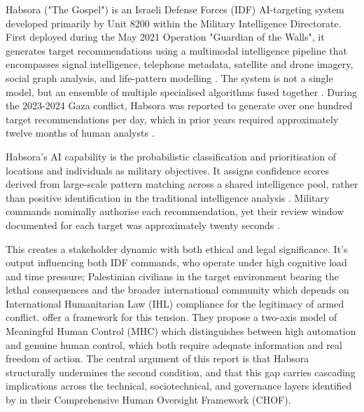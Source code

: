 Habsora ("The Gospel") is an Israeli Defense Forces (IDF) AI-targeting system developed primarily by Unit 8200 within the Military Intelligence Directorate. First deployed during the May 2021 Operation "Guardian of the Walls", it generates target recommendations using a multimodal intelligence pipeline that encompasses signal intelligence, telephone metadata, satellite and drone imagery, social graph analysis, and life-pattern modelling \cite{abraham_2024, dwoskin_2024}. The system is not a single model, but an ensemble of multiple specialised algorithms fused together \cite{dwoskin_2024}. During the 2023-2024 Gaza conflict, Habsora was reported to generate over one hundred target recommendations per day, which in prior years required approximately twelve months of human analysts \cite{abraham_2024, ynet_2024}.

Habsora's AI capability is the probabilistic classification and prioritisation of locations and individuals as military objectives. It assigns confidence scores derived from large-scale pattern matching across a shared intelligence pool, rather than positive identification in the traditional intelligence analysis \cite{ootlaws}. Military commands nominally authorise each recommendation, yet their review window documented for each target was approximately twenty seconds \cite{abraham_2024}.

This creates a stakeholder dynamic with both ethical and legal significance. It's output influencing both IDF commands, who operate under high cognitive load and time pressure; Palestinian civilians in the target environment bearing the lethal consequences and the broader international community which depends on International Humanitarian Law (IHL) compliance for the legitimacy of armed conflict. \citet{mhcof} offer a framework for this tension. They propose a two-axis model of Meaningful Human Control (MHC) which distinguishes between high automation and genuine human control, which both require adequate information and real freedom of action. The central argument of this report is that Habsora structurally undermines the second condition, and that this gap carries cascading implications across the technical, sociotechnical, and governance layers identified by \citet{info12090385} in their Comprehensive Human Oversight Framework (CHOF).